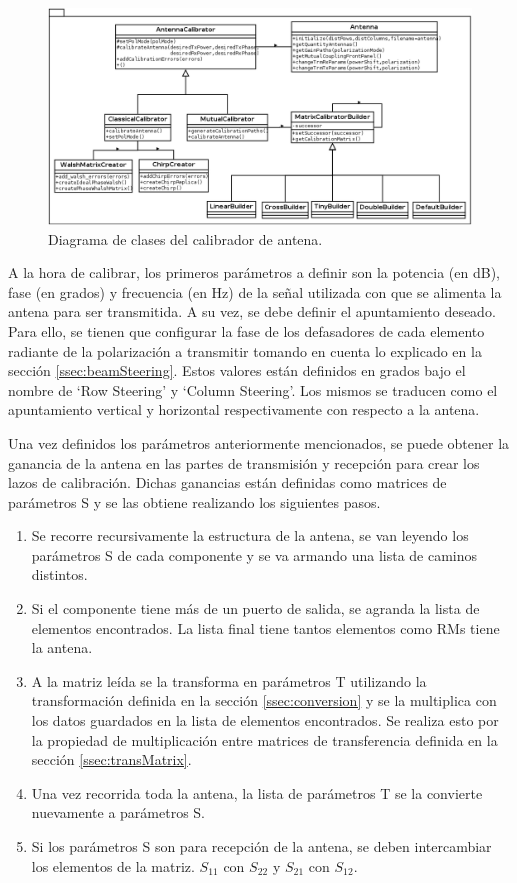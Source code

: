 \begin{figure}
 \centering
 \includegraphics[width=15cm]{gfx/modelPackage.png}
 \caption{Diagrama de clases del calibrador de antena.}
 \label{fig:modelPackage}
\end{figure}


A la hora de calibrar, los primeros parámetros a definir son la potencia (en dB), fase (en grados) y frecuencia (en Hz) de la 
señal utilizada con que se alimenta la antena para ser transmitida. A su vez, se debe definir el apuntamiento deseado. Para 
ello, se tienen que configurar la fase de los defasadores de cada elemento radiante de la polarización a transmitir tomando 
en cuenta lo explicado en la sección \ref{ssec:beamSteering}. Estos valores están definidos en grados bajo el nombre de 
\enquote*{Row Steering} y \enquote*{Column Steering}. Los mismos se traducen como el apuntamiento vertical y horizontal 
respectivamente con respecto a la antena.

Una vez definidos los parámetros anteriormente mencionados, se puede obtener la ganancia de la antena en las partes de 
transmisión y recepción para crear los lazos de calibración. Dichas ganancias están definidas como matrices de parámetros
S y se las obtiene realizando los siguientes pasos.

\begin{enumerate}
	\item Se recorre recursivamente la estructura de la antena, se van leyendo los parámetros S de cada componente y se va 
		armando una lista de caminos distintos.
	\item Si el componente tiene más de un puerto de salida, se agranda la lista de elementos encontrados. La lista final tiene 
		tantos elementos como RMs tiene la antena.
	\item A la matriz leída se la transforma en parámetros T utilizando la transformación definida en la sección 
		\ref{ssec:conversion} y se la multiplica con los datos guardados en la lista de elementos encontrados. Se realiza esto 
		por la propiedad de multiplicación entre matrices de transferencia definida en la sección \ref{ssec:transMatrix}.
	\item Una vez recorrida toda la antena, la lista de parámetros T se la convierte nuevamente a parámetros S.
	\item Si los parámetros S son para recepción de la antena, se deben intercambiar los elementos de la matriz. $S_{11}$ con 
		$S_{22}$ y $S_{21}$ con $S_{12}$.
\end{enumerate}

